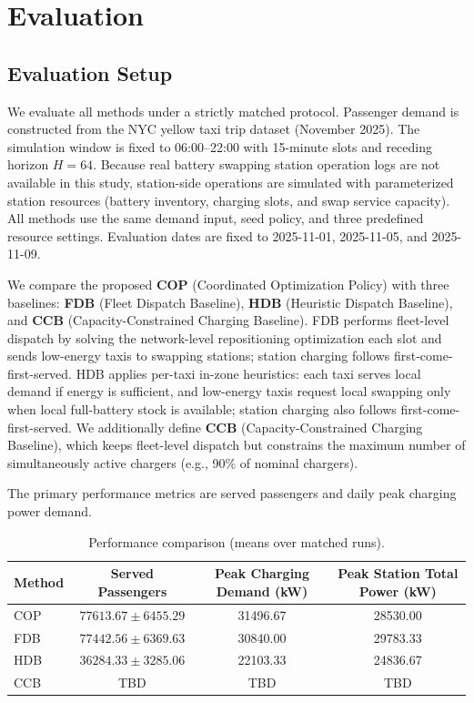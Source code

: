 \section{Evaluation}

\subsection{Evaluation Setup}
We evaluate all methods under a strictly matched protocol.
Passenger demand is constructed from the NYC yellow taxi trip dataset (November 2025)\cite{nyc_yellow_taxi_dataset}.
The simulation window is fixed to 06:00--22:00 with 15-minute slots and receding horizon $H=64$.
Because real battery swapping station operation logs are not available in this study, station-side operations are simulated with parameterized station resources (battery inventory, charging slots, and swap service capacity).
All methods use the same demand input, seed policy, and three predefined resource settings.
Evaluation dates are fixed to 2025-11-01, 2025-11-05, and 2025-11-09.

We compare the proposed \textbf{COP} (Coordinated Optimization Policy) with three baselines:
\textbf{FDB} (Fleet Dispatch Baseline),
\textbf{HDB} (Heuristic Dispatch Baseline), and
\textbf{CCB} (Capacity-Constrained Charging Baseline).
FDB performs fleet-level dispatch by solving the network-level repositioning optimization each slot and sends low-energy taxis to swapping stations; station charging follows first-come-first-served.
HDB applies per-taxi in-zone heuristics: each taxi serves local demand if energy is sufficient, and low-energy taxis request local swapping only when local full-battery stock is available; station charging also follows first-come-first-served.
We additionally define \textbf{CCB} (Capacity-Constrained Charging Baseline), which keeps fleet-level dispatch but constrains the maximum number of simultaneously active chargers (e.g., 90\% of nominal chargers).

The primary performance metrics are served passengers and daily peak charging power demand.

\begin{table}[t]
\centering
\footnotesize
\setlength{\tabcolsep}{6pt}
\renewcommand{\arraystretch}{1.05}
\caption{Performance comparison (means over matched runs).}
\label{tab:primary_aggregate}
\begin{tabular}{lccc}
\hline
Method & Served Passengers & Peak Charging Demand (kW) & Peak Station Total Power (kW) \\
\hline
COP & $77613.67 \pm 6455.29$ & 31496.67 & 28530.00 \\
FDB & $77442.56 \pm 6369.63$ & 30840.00 & 29783.33 \\
HDB & $36284.33 \pm 3285.06$ & 22103.33 & 24836.67 \\
CCB & TBD & TBD & TBD \\
\hline
\end{tabular}
\end{table}

